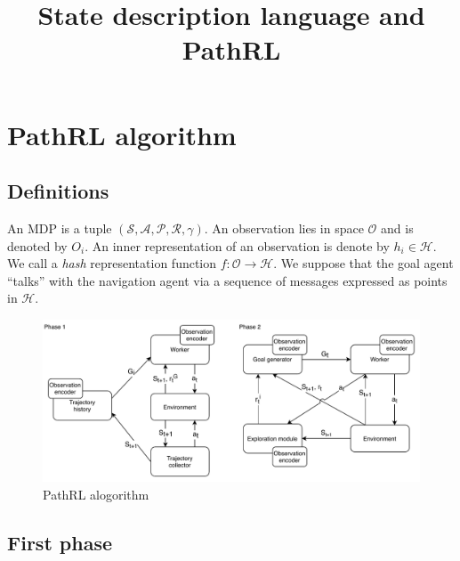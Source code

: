 \documentclass[acmsmall, nonacm]{acmart}
\title{State description language and PathRL}
\begin{document}
\maketitle

\section{PathRL algorithm}

\subsection{Definitions}

An MDP is a tuple $(\mathcal{S}, \mathcal{A}, \mathcal{P}, \mathcal{R}, \gamma)$. An observation lies in space $\mathcal{O}$ and is denoted by $O_i$. An inner representation of an observation is denote by $h_i \in \mathcal{H}$. We call a \emph{hash} representation function $
f: \mathcal{O} \rightarrow \mathcal{H}
$. We suppose that the goal agent ``talks'' with the navigation agent via a sequence of messages expressed as points in $\mathcal{H}$.

\begin{figure}
  \centering
  \includegraphics[width=0.9\linewidth]{./assets/diagram.pdf}
  \caption{PathRL alogorithm}
  \label{fig:pathrl}
\end{figure}

\subsection{First phase}
\end{document}

